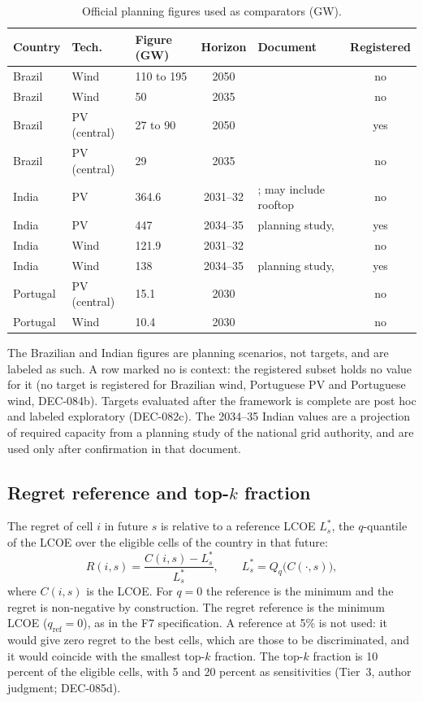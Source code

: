 \begin{table}[ht]
\centering
\caption{Official planning figures used as comparators (GW).}
\label{tab:g4-targets}
\small
\begin{tabular}{llp{2.2cm}cp{3.6cm}c}
\toprule
Country & Tech. & Figure (GW) & Horizon & Document & Registered \\
\midrule
Brazil   & Wind & 110 to 195 & 2050 & \citet{epe2020pne} & no \\
Brazil   & Wind & 50 & 2035 & \citet{epe2026pde}\vfy{} & no \\
Brazil   & PV (central) & 27 to 90 & 2050 & \citet{epe2020pne} & yes \\
Brazil   & PV (central) & 29 & 2035 & \citet{epe2026pde}\vfy{} & no \\
India    & PV   & 364.6 & 2031--32 & \citet{cea2023nep}; may include rooftop\vfy{} & no \\
India    & PV   & 447 & 2034--35 & planning study, \citet{moP2026annual}\vfy{} & yes \\
India    & Wind & 121.9 & 2031--32 & \citet{cea2023nep} & no \\
India    & Wind & 138 & 2034--35 & planning study, \citet{moP2026annual}\vfy{} & yes \\
Portugal & PV (central) & 15.1 & 2030 & \citet{pnec2025} & no \\
Portugal & Wind & 10.4 & 2030 & \citet{pnec2025} & no \\
\bottomrule
\end{tabular}
\end{table}

The Brazilian and Indian figures are planning scenarios, not targets, and are labeled as such. A row marked no is context: the registered subset holds no value for it (no target is registered for Brazilian wind, Portuguese PV and Portuguese wind, DEC-084b). Targets evaluated after the framework is complete are post hoc and labeled exploratory (DEC-082c). The 2034--35 Indian values are a projection of required capacity from a planning study of the national grid authority, and are used only after confirmation in that document.

\subsection{Regret reference and top-$k$ fraction}
\label{sec:g4-q}
The regret of cell $i$ in future $s$ is relative to a reference LCOE $L^{*}_{s}$, the $q$-quantile of the LCOE over the eligible cells of the country in that future:
\begin{equation}
R(i,s) = \frac{C(i,s) - L^{*}_{s}}{L^{*}_{s}}, \qquad L^{*}_{s} = Q_{q}\!\big(C(\cdot,s)\big),
\end{equation}
where $C(i,s)$ is the LCOE. For $q = 0$ the reference is the minimum and the regret is non-negative by construction. The regret reference is the minimum LCOE ($q_{\mathrm{ref}} = 0$), as in the F7 specification.
A reference at 5\% is not used: it would give zero regret to the best cells, which are those to be discriminated, and it would coincide with the smallest top-$k$ fraction. The top-$k$ fraction is 10 percent of the eligible cells, with 5 and 20 percent as sensitivities (Tier~3, author judgment; DEC-085d).

